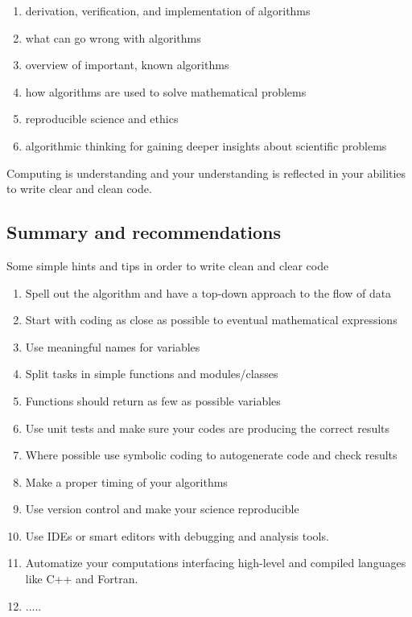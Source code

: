 \begin{enumerate}
\item derivation, verification, and implementation of algorithms

\item what can go wrong with algorithms

\item overview of important, known algorithms

\item how algorithms are used to solve mathematical problems

\item reproducible science and ethics

\item algorithmic thinking for gaining deeper insights about scientific problems
\end{enumerate}

\noindent
Computing is understanding and your understanding is reflected in your abilities to
write clear and clean code.

\subsection*{Summary and recommendations}
Some simple hints and tips in order to write clean and clear code
\begin{enumerate}
\item Spell out the algorithm and have a top-down approach to the flow of data

\item Start with coding as close as possible to eventual mathematical expressions

\item Use meaningful names for variables

\item Split tasks in simple functions and modules/classes

\item Functions should return as few as possible variables

\item Use unit tests and make sure your codes are producing the correct results

\item Where possible use symbolic coding to autogenerate code and check results

\item Make a proper timing of your algorithms

\item Use version control and make your science reproducible

\item Use IDEs or smart editors with debugging and analysis tools.

\item Automatize your computations interfacing high-level and compiled languages like C++ and Fortran.

\item .....
\end{enumerate}

